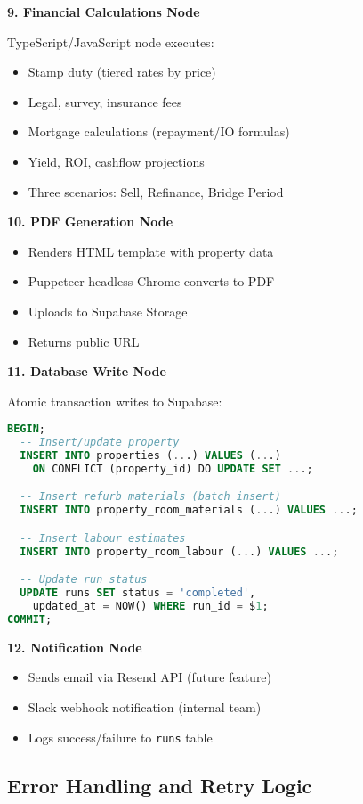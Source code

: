 \documentclass[11pt,a4paper]{article}
\begin{document}
\textbf{9. Financial Calculations Node}

TypeScript/JavaScript node executes:
\begin{itemize}
  \item Stamp duty (tiered rates by price)
  \item Legal, survey, insurance fees
  \item Mortgage calculations (repayment/IO formulas)
  \item Yield, ROI, cashflow projections
  \item Three scenarios: Sell, Refinance, Bridge Period
\end{itemize}

\textbf{10. PDF Generation Node}
\begin{itemize}
  \item Renders HTML template with property data
  \item Puppeteer headless Chrome converts to PDF
  \item Uploads to Supabase Storage
  \item Returns public URL
\end{itemize}

\textbf{11. Database Write Node}

Atomic transaction writes to Supabase:
\begin{lstlisting}[language=SQL, caption=Database Insert Transaction]
BEGIN;
  -- Insert/update property
  INSERT INTO properties (...) VALUES (...)
    ON CONFLICT (property_id) DO UPDATE SET ...;

  -- Insert refurb materials (batch insert)
  INSERT INTO property_room_materials (...) VALUES ...;

  -- Insert labour estimates
  INSERT INTO property_room_labour (...) VALUES ...;

  -- Update run status
  UPDATE runs SET status = 'completed',
    updated_at = NOW() WHERE run_id = $1;
COMMIT;
\end{lstlisting}

\textbf{12. Notification Node}
\begin{itemize}
  \item Sends email via Resend API (future feature)
  \item Slack webhook notification (internal team)
  \item Logs success/failure to \texttt{runs} table
\end{itemize}

\subsection{Error Handling and Retry Logic}
\end{document}
